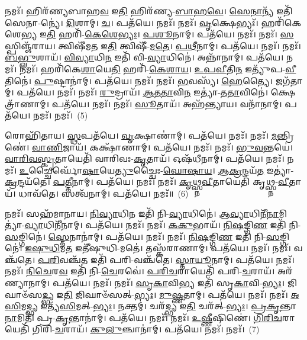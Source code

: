 𑌨𑌮𑌃᳴। 𑌹𑌿𑌰᳴𑌣𑍍𑌯𑌬𑌾𑌹\-\ul{𑌵} 𑌇\-\ul{𑌤𑌿} 𑌹𑌿𑌰᳴𑌣𑍍𑌯-\-\ul{𑌬𑌾}\-\-\ul{𑌹}\-\-\ul{𑌵𑍇}\-। \ul{𑌸𑍇}\-\-\ul{𑌨𑌾}\-𑌨𑍍𑌯᳴ 𑌇𑌤𑌿᳴ 𑌸𑍇𑌨𑌾-𑌨𑍍𑌯𑍇॑। \ul{𑌦𑌿}\-𑌶𑌾𑌮𑍍। \ul{𑌚}\-। 𑌪𑌤᳴𑌯𑍇। 𑌨𑌮𑌃᳴। 
𑌨𑌮𑌃᳴। \ul{𑌵𑍃}\-𑌕𑍍𑌷𑍇𑌭𑍍𑌯𑌃᳴। 𑌹𑌰𑌿᳴𑌕𑍇𑌶𑍇\-\ul{𑌭𑍍𑌯} 𑌇\-\ul{𑌤𑌿} 𑌹𑌰𑌿᳴-\-\ul{𑌕𑍇}\-\-\ul{𑌶𑍇}\-\-\ul{𑌭𑍍𑌯𑌃}\-। \ul{𑌪}\-\-\ul{𑌶𑍂}\-𑌨𑌾𑌮𑍍। 𑌪𑌤᳴𑌯𑍇। 𑌨𑌮𑌃᳴। 
𑌨𑌮𑌃᳴। \ul{𑌸}\-𑌸𑍍𑌪𑌿𑌞𑍍𑌜᳴𑌰𑌾𑌯। 𑌤𑍍𑌵𑌿𑌷𑍀᳴𑌮\-\ul{𑌤} 𑌇\-\ul{𑌤𑌿} 𑌤𑍍𑌵𑌿𑌷𑍀᳴-\-\ul{𑌮}\-\-\ul{𑌤𑍇}\-। \ul{𑌪}\-\-\ul{𑌥𑍀}\-𑌨𑌾𑌮𑍍। 𑌪𑌤᳴𑌯𑍇। 𑌨𑌮𑌃᳴। 
𑌨𑌮𑌃᳴। \ul{𑌬}\-\-\ul{𑌭𑍍𑌲𑍁}\-𑌶𑌾𑌯᳴। \ul{𑌵𑌿}\-\-\ul{𑌵𑍍𑌯𑌾}\-𑌧𑌿\-\ul{𑌨} 𑌇𑌤𑌿᳴ 𑌵𑌿-\-\ul{𑌵𑍍𑌯𑌾}\-𑌧𑌿𑌨𑍇॑। 𑌅𑌨𑍍𑌨𑌾᳴𑌨𑌾𑌮𑍍। 𑌪𑌤᳴𑌯𑍇। 𑌨𑌮𑌃᳴। 
𑌨𑌮𑌃᳴। 𑌹𑌰𑌿᳴𑌕𑍇\-\ul{𑌶𑌾}\-𑌯𑍇\-\ul{𑌤𑌿} 𑌹𑌰𑌿᳴-\-\ul{𑌕𑍇}\-\-\ul{𑌶𑌾}\-\-\ul{𑌯}\-। \ul{𑌉}\-\-\ul{𑌪}\-\-\ul{𑌵𑍀}\-𑌤𑌿\-\ul{𑌨} 𑌇𑌤𑍍𑌯𑍁᳴𑌪-\-\ul{𑌵𑍀}\-𑌤𑌿𑌨𑍇॑। \ul{𑌪𑍁}\-𑌷𑍍𑌟𑌾𑌨𑌾॑𑌮𑍍। 𑌪𑌤᳴𑌯𑍇। 𑌨𑌮𑌃᳴। 
𑌨𑌮𑌃᳴। \ul{𑌭}\-𑌵𑌸𑍍𑌯᳴। \ul{𑌹𑍇}\-𑌤𑍍𑌯𑍈। 𑌜𑌗᳴𑌤𑌾𑌮𑍍। 𑌪𑌤᳴𑌯𑍇। 𑌨𑌮𑌃᳴। 
𑌨𑌮𑌃᳴। \ul{𑌰𑍁}\-𑌦𑍍𑌰𑌾𑌯᳴। \ul{𑌆}\-\-\ul{𑌤}\-\-\ul{𑌤𑌾}\-𑌵𑌿\-\ul{𑌨} 𑌇𑌤𑍍𑌯𑌾॑-\-\ul{𑌤}\-\-\ul{𑌤𑌾}\-𑌵𑌿𑌨𑍇॑। 𑌕𑍍𑌷𑍇𑌤𑍍𑌰𑌾᳴𑌣𑌾𑌮𑍍। 𑌪𑌤᳴𑌯𑍇। 𑌨𑌮𑌃᳴। 
𑌨𑌮𑌃᳴। \ul{𑌸𑍂}\-𑌤𑌾𑌯᳴। 𑌅𑌹᳴𑌨𑍍𑌤𑍍𑌯𑌾𑌯। 𑌵𑌨𑌾᳴𑌨𑌾𑌮𑍍। 𑌪𑌤᳴𑌯𑍇। 𑌨𑌮𑌃᳴। 
𑌨𑌮𑌃᳴।~(5)


𑌰𑍋𑌹𑌿᳴𑌤𑌾𑌯। \ul{𑌸𑍍𑌥}\-𑌪𑌤᳴𑌯𑍇। \ul{𑌵𑍃}\-𑌕𑍍𑌷𑌾𑌣𑌾॑𑌮𑍍। 𑌪𑌤᳴𑌯𑍇। 𑌨𑌮𑌃᳴। 
𑌨𑌮𑌃᳴। \ul{𑌮}\-𑌨𑍍𑌤𑍍𑌰𑌿𑌣𑍇॑। \ul{𑌵𑌾}\-\-\ul{𑌣𑌿}\-𑌜𑌾𑌯᳴। 𑌕𑌕𑍍𑌷𑌾᳴𑌣𑌾𑌮𑍍। 𑌪𑌤᳴𑌯𑍇। 𑌨𑌮𑌃᳴। 
𑌨𑌮𑌃᳴। \ul{𑌭𑍁}\-\-\ul{𑌵}\-𑌨𑍍𑌤𑌯𑍇॑। \ul{𑌵𑌾}\-\-\ul{𑌰𑌿}\-\-\ul{𑌵}\-\-\ul{𑌸𑍍𑌕𑍃}\-𑌤𑌾𑌯𑍇𑌤𑌿᳴ 𑌵𑌾𑌰𑌿𑌵𑌃-\-\ul{𑌕𑍃}\-𑌤𑌾𑌯᳴। 𑌓𑌷᳴𑌧𑍀𑌨𑌾𑌮𑍍। 𑌪𑌤᳴𑌯𑍇। 𑌨𑌮𑌃᳴। 
𑌨𑌮𑌃᳴। \ul{𑌉}\-𑌚𑍍𑌚𑍈𑌰𑍍𑌘𑍋᳴\-\ul{𑌷𑌾}\-𑌯𑍇\-\ul{𑌤𑍍𑌯𑍁}\-𑌚𑍍𑌚𑍈𑌃-\-\ul{𑌘𑍋}\-\-\ul{𑌷𑌾}\-\-\ul{𑌯}\-। \ul{𑌆}\-\-\ul{𑌕𑍍𑌰}\-𑌨𑍍𑌦𑌯᳴\-\ul{𑌤} 𑌇𑌤𑍍𑌯𑌾॑-\-\ul{𑌕𑍍𑌰}\-𑌨𑍍𑌦𑌯᳴𑌤𑍇। \ul{𑌪}\-\-\ul{𑌤𑍍𑌤𑍀}\-𑌨𑌾𑌮𑍍। 𑌪𑌤᳴𑌯𑍇। 𑌨𑌮𑌃᳴। 
𑌨𑌮𑌃᳴। \ul{𑌕𑍃}\-\-\ul{𑌥𑍍𑌸𑍍𑌨}\-\-\ul{𑌵𑍀}\-𑌤𑌾𑌯𑍇𑌤𑌿᳴ 𑌕𑍃𑌥𑍍𑌸𑍍𑌨-\-\ul{𑌵𑍀}\-𑌤𑌾𑌯᳴। 𑌧𑌾𑌵᳴𑌤𑍇। 𑌸𑌤𑍍𑌵᳴𑌨𑌾𑌮𑍍। 𑌪𑌤᳴𑌯𑍇। 𑌨𑌮𑌃᳴॥~(6)


𑌨𑌮𑌃᳴। 𑌸𑌹᳴𑌮𑌾𑌨𑌾𑌯। \ul{𑌨𑌿}\-\-\ul{𑌵𑍍𑌯𑌾}\-𑌧𑌿\-\ul{𑌨} 𑌇𑌤𑌿᳴ 𑌨𑌿-\-\ul{𑌵𑍍𑌯𑌾}\-𑌧𑌿𑌨𑍇॑। \ul{𑌆}\-\-\ul{𑌵𑍍𑌯𑌾}\-𑌧𑌿𑌨𑍀᳴\-\ul{𑌨𑌾}\-\-𑌮𑌿𑌤𑍍𑌯𑌾॑-\-\ul{𑌵𑍍𑌯𑌾}\-𑌧𑌿𑌨𑍀᳴𑌨𑌾𑌮𑍍। 𑌪𑌤᳴𑌯𑍇। 𑌨𑌮𑌃᳴। 
𑌨𑌮𑌃᳴। \ul{𑌕}\-\-\ul{𑌕𑍁}\-𑌭𑌾𑌯᳴। \ul{𑌨𑌿}\-\-\ul{𑌷}\-𑌙𑍍𑌗𑌿\-\ul{𑌣} 𑌇𑌤𑌿᳴ 𑌨𑌿-\-\ul{𑌸}\-𑌙𑍍𑌗𑌿𑌨𑍇॑। \ul{𑌸𑍍𑌤𑍇}\-𑌨𑌾𑌨𑌾॑𑌮𑍍। 𑌪𑌤᳴𑌯𑍇। 𑌨𑌮𑌃᳴। 
𑌨𑌮𑌃᳴। \ul{𑌨𑌿}\-\-\ul{𑌷}\-𑌙𑍍𑌗𑌿\-\ul{𑌣} 𑌇𑌤𑌿᳴ 𑌨𑌿-\-\ul{𑌸}\-𑌙𑍍𑌗𑌿𑌨𑍇॑। \ul{𑌇}\-\-\ul{𑌷𑍁}\-\-\ul{𑌧𑌿}\-𑌮\-\ul{𑌤} 𑌇𑌤𑍀᳴𑌷𑍁𑌧𑌿-𑌮𑌤𑍇॑। 𑌤𑌸𑍍𑌕᳴𑌰𑌾𑌣𑌾𑌮𑍍। 𑌪𑌤᳴𑌯𑍇। 𑌨𑌮𑌃᳴। 
𑌨𑌮𑌃᳴। 𑌵𑌞𑍍𑌚᳴𑌤𑍇। \ul{𑌪}\-\-\ul{𑌰𑌿}\-𑌵𑌞𑍍𑌚᳴\-\ul{𑌤} 𑌇𑌤𑌿᳴ 𑌪𑌰𑌿-𑌵𑌞𑍍𑌚᳴𑌤𑍇। \ul{𑌸𑍍𑌤𑌾}\-\-\ul{𑌯𑍂}\-𑌨𑌾𑌮𑍍। 𑌪𑌤᳴𑌯𑍇। 𑌨𑌮𑌃᳴। 
𑌨𑌮𑌃᳴। \ul{𑌨𑌿}\-\-\ul{𑌚𑍇}\-𑌰\-\ul{𑌵} 𑌇𑌤𑌿᳴ 𑌨𑌿-\-\ul{𑌚𑍇}\-𑌰𑌵𑍇॑। \ul{𑌪}\-\-\ul{𑌰𑌿}\-\-\ul{𑌚}\-𑌰𑌾𑌯𑍇𑌤𑌿᳴ 𑌪𑌰𑌿-\-\ul{𑌚}\-𑌰𑌾𑌯᳴। 𑌅𑌰᳴𑌣𑍍𑌯𑌾𑌨𑌾𑌮𑍍। 𑌪𑌤᳴𑌯𑍇। 𑌨𑌮𑌃᳴। 
𑌨𑌮𑌃᳴। \ul{𑌸𑍃}\-\-\ul{𑌕𑌾}\-𑌵𑌿\-\ul{𑌭𑍍𑌯} 𑌇𑌤𑌿᳴ 𑌸𑍃\-\ul{𑌕𑌾}\-𑌵𑌿-\-\ul{𑌭𑍍𑌯𑌃}\-। 𑌜𑌿𑌘𑌾𑍞᳴𑌸\-\ul{𑌦𑍍𑌭𑍍𑌯} 𑌇\-\ul{𑌤𑌿} 𑌜𑌿𑌘𑌾𑍞᳴𑌸𑌤𑍍-\-\ul{𑌭𑍍𑌯𑌃}\-। \ul{𑌮𑍁}\-\-\ul{𑌷𑍍𑌣}\-𑌤𑌾𑌮𑍍। 𑌪𑌤᳴𑌯𑍇। 𑌨𑌮𑌃᳴। 
𑌨𑌮𑌃᳴। \ul{𑌅}\-\-\ul{𑌸𑌿}\-𑌮\-\ul{𑌦𑍍𑌭𑍍𑌯} 𑌇𑌤𑍍𑌯᳴\-\ul{𑌸𑌿}\-𑌮𑌤𑍍-\-\ul{𑌭𑍍𑌯𑌃}\-। 𑌨𑌕𑍍𑌤𑌮𑍍॑। 𑌚𑌰᳴\-\ul{𑌦𑍍𑌭𑍍𑌯} 𑌇\-\ul{𑌤𑌿} 𑌚𑌰᳴𑌤𑍍-\-\ul{𑌭𑍍𑌯𑌃}\-। \ul{𑌪𑍍𑌰}\-\-\ul{𑌕𑍃}\-𑌨𑍍𑌤𑌾\-\ul{𑌨𑌾}\-𑌮𑌿𑌤𑌿᳴ 𑌪𑍍𑌰-\-\ul{𑌕𑍃}\-𑌨𑍍𑌤𑌾𑌨𑌾॑𑌮𑍍। 𑌪𑌤᳴𑌯𑍇। 𑌨𑌮𑌃᳴। 
𑌨𑌮𑌃᳴। \ul{𑌉}\-\-\ul{𑌷𑍍𑌣𑍀}\-𑌷𑌿𑌣𑍇॑। \ul{𑌗𑌿}\-\-\ul{𑌰𑌿}\-\-\ul{𑌚}\-𑌰𑌾𑌯𑍇𑌤𑌿᳴ 𑌗𑌿𑌰𑌿-\-\ul{𑌚}\-𑌰𑌾𑌯᳴। \ul{𑌕𑍁}\-\-\ul{𑌲𑍁}\-𑌞𑍍𑌚𑌾𑌨𑌾॑𑌮𑍍। 𑌪𑌤᳴𑌯𑍇। 𑌨𑌮𑌃᳴। 𑌨𑌮𑌃᳴।~(7)


